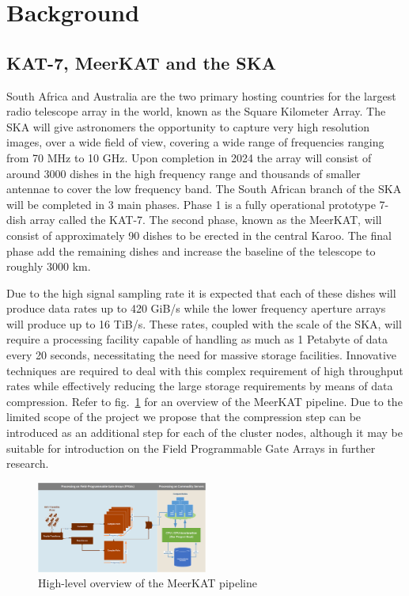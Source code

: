 \documentclass{acm_proc_article-sp}
\begin{document}
\section{Background}
\subsection{KAT-7, MeerKAT and the SKA}
South Africa and Australia are the two primary hosting countries for the largest radio telescope array in the world, known as the Square Kilometer Array. 
The SKA will give astronomers the opportunity to capture very high resolution images, over a wide field of view, covering a wide range of frequencies ranging 
from 70 MHz to 10 GHz. Upon completion in 2024 the array will consist of around 3000 dishes in the high frequency range and thousands of smaller antennae to 
cover the low frequency band. The South African branch of the SKA will be completed in 3 main phases. Phase 1 is a fully operational prototype 7-dish array 
called the KAT-7. The second phase, known as the MeerKAT, will consist of approximately 90 dishes to be erected in the central Karoo. The final phase add 
the remaining dishes and increase the baseline of the telescope to roughly 3000 km.

Due to the high signal sampling rate it is expected that each of these dishes will produce data rates up to 420 GiB/s while the lower frequency aperture arrays 
will produce up to 16 TiB/s. These rates, coupled with the scale of the SKA, will require a processing facility capable of handling as much as 1 Petabyte of 
data every 20 seconds, necessitating the need for massive storage facilities. Innovative techniques are required to deal with this complex requirement of high 
throughput rates while effectively reducing the large storage requirements by means of data compression. Refer to fig.~\ref{MeerKAT_PIPELINE} for an overview of
the MeerKAT pipeline. Due to the limited scope of the project we propose that the compression step can be introduced as an additional step for each of the cluster
nodes, although it may be suitable for introduction on the Field Programmable Gate Arrays in further research.
\begin{figure}[h!]
 \centering
 \includegraphics[width=0.50\textwidth]{Process.png}
 \caption{High-level overview of the MeerKAT pipeline}
 \label{MeerKAT_PIPELINE}
\end{figure}
\end{document}
